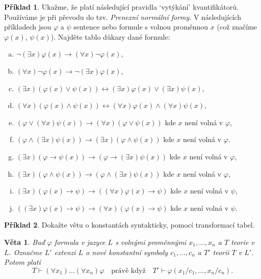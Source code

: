 \documentclass[a4paper]{article}
\theoremstyle{plain}
\newtheorem*{theorem*}{Věta}
\theoremstyle{definition}
\newtheorem{problem}{Příklad}
\begin{document}
\medskip\begin{problem} %
    Ukažme, že platí následující pravidla `vytýkání' kvantifikátorů. Používáme je při převodu do tzv. \emph{Prenexní normální formy}. V následujících příkladech jsou $\varphi$ a $\psi$ sentence nebo formule s volnou proměnnou $x$ (což značíme $\varphi(x)$, $\psi(x)$). Najděte tablo důkazy dané formule:
\begin{enumerate}[(a)]
    \item $\neg(\exists x)\varphi(x)\to (\forall x)\neg \varphi(x)$,
    \item $(\forall x)\neg \varphi(x)\to \neg(\exists x)\varphi(x)$,
    \item $(\exists x)(\varphi(x)\vee \psi(x))\leftrightarrow (\exists x)\varphi(x)\vee (\exists x)\psi(x)$,
    \item $(\forall x)(\varphi(x)\wedge\psi(x))\leftrightarrow (\forall x)\varphi(x)\wedge(\forall x)\psi(x)$,
    \item $(\varphi \vee (\forall x)\psi(x))\to (\forall x)(\varphi \vee \psi(x))$ kde $x$ není volná v $\varphi$,
    \item $(\varphi \wedge (\exists x)\psi(x))\to (\exists x)(\varphi \wedge \psi(x))$ kde $x$ není volná v $\varphi$.
    \item $(\exists x)(\varphi \to \psi(x))\to(\varphi \to (\exists x)\psi(x))$ kde $x$ není volná v $\varphi$,
    \item $(\exists x)(\varphi \wedge \psi(x))\to(\varphi \wedge (\exists x)\psi(x))$ kde $x$ není volná v $\varphi$,
    \item $(\exists x)(\varphi(x)\to\psi)\to((\forall x)\varphi(x)\to \psi)$ kde $x$ není volná v $\psi$,
    \item $((\exists x)\varphi(x)\to\psi)\to(\forall x)(\varphi(x)\to \psi)$ kde $x$ není volná v $\psi$.
\end{enumerate}
\end{problem}


\medskip\begin{problem} Dokažte větu o konstantách syntakticky, pomocí transformací tabel.
\begin{theorem*} Buď $\varphi$ formula v jazyce $L$ s volnými proměnnými $x_1,\dots,x_n$ a $T$ teorie v $L$. Označme $L'$ extenzi $L$ o nové konstantní symboly $c_1,\dots,c_n$ a $T'$ teorii $T$ v $L'$. Potom platí
    $$T \vdash (\forall x_1)\dots(\forall x_n)\varphi \quad\text{právě když}\quad T'\vdash\varphi(x_1/c_1,\dots,x_n/c_n).$$
\end{theorem*}
\end{problem} 
  
\end{document}

